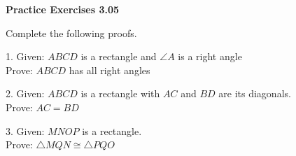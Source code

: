 \vspace{0.3ex}
\noindent\textbf{Practice Exercises 3.05}

\vspace{0.2ex}

Complete the following proofs.

\begin{minipage}[c]{0.35\textwidth}
1. Given: \(ABCD\) is a rectangle and \(\angle A\) is a right angle\\
Prove: \(ABCD\) has all right angles
\end{minipage}
\begin{minipage}[c]{0.14\textwidth}

\end{minipage}

\begin{minipage}[c]{0.35\textwidth}
2. Given: \(ABCD\) is a rectangle with \(AC\) and \(BD\) are its diagonals.\\
Prove: \(AC = BD\)
\end{minipage}
\begin{minipage}[c]{0.14\textwidth}

\end{minipage}

\begin{minipage}[c]{0.35\textwidth}
3. Given:  \(MNOP\) is a rectangle.\\
Prove: \(\bigtriangleup MQN \cong \bigtriangleup PQO\)
\end{minipage}
\begin{minipage}[c]{0.14\textwidth}

\end{minipage}

